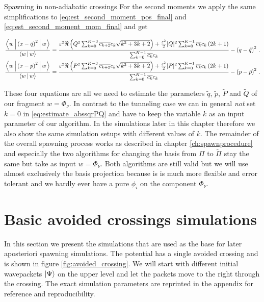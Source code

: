 \begin{chapter}{Spawning in non-adiabatic crossings}
For the second moments we apply the same simplifications to \eqref{eq:est_second_moment_pos_final}
and \eqref{eq:est_second_moment_mom_final} and get

\begin{align} \label{eq:est_second_moment_pos_na}
  \frac{\Braket{w|\left(x-\tilde{q}\right)^2|w}}{\Braket{w|w}} & =
  \frac{
    \varepsilon^2 \Re \left( Q^2 \sum_{k=0}^{K-3} \overline{c_{k+2}} c_{k} \sqrt{k^2+3k+2} \right) 
    + \frac{\varepsilon^2}{2} |Q|^2 \sum_{k=0}^{K-1} \overline{c_k} c_k \left(2k+1\right)
  }{\sum_{k=0}^{K-1} \overline{c_k} c_k}
  - \left(q - \tilde{q}\right)^2 \,.
  \\ \label{eq:est_second_moment_mom_na}
  \frac{\Braket{w|\left(x-\tilde{p}\right)^2|w}}{\Braket{w|w}} & =
  \frac{
    \varepsilon^2 \Re \left( P^2 \sum_{k=0}^{K-3} \overline{c_{k+2}} c_{k} \sqrt{k^2+3k+2} \right) 
    + \frac{\varepsilon^2}{2} |P|^2 \sum_{k=0}^{K-1} \overline{c_k} c_k \left(2k+1\right)
  }{\sum_{k=0}^{K-1} \overline{c_k} c_k}
  - \left(p - \tilde{p}\right)^2 \,.
\end{align}

These four equations are all we need to estimate the parameters $\tilde{q}$, $\tilde{p}$,
$\tilde{P}$ and $\tilde{Q}$ of our fragment $w = \Phi_\nu$. In contrast to the tunneling
case we can in general \emph{not} set $k=0$ in \eqref{eq:estimate_abssqrPQ} and have
to keep the variable $k$ as an input parameter of our algorithm. In the simulations later
in this chapter therefore we also show the same simulation setups with different values
of $k$. The remainder of the overall spawning process works as described in chapter 
\ref{ch:spawnprocedure} and especially the two algorithms for changing the basis
from $\Pi$ to $\tilde{\Pi}$ stay the same but take as input $w = \Phi_\nu$. Both
algorithms are still valid but we will use almost exclusively the basis projection
because is is much more flexible and error tolerant and we hardly ever have a pure
$\phi_i$ on the component $\Phi_\nu$.


\section{Basic avoided crossings simulations}

In this section we present the simulations that are used as the base for later
aposteriori spawning simulations. The potential has a single avoided crossing
and is shown in figure \ref{fig:avoided_crossing}. We will start with different
initial wavepackets $\Ket{\Psi}$ on the upper level and let the packets move to
the right through the crossing. The exact simulation parameters are reprinted in
the appendix for reference and reproducibility.


\end{chapter}
